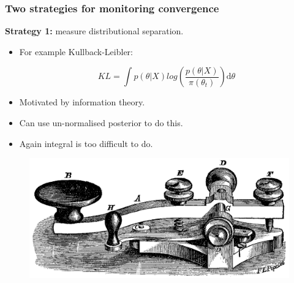 \documentclass[handout]{beamer}
\begin{document}
\begin{frame}
\frametitle{Two strategies for monitoring convergence}

\textbf{Strategy 1:} measure distributional separation.
\begin{itemize}
\item<3-> For example Kullback-Leibler:

\begin{equation}
KL=\int p(\theta|X) log\left(\frac{p(\theta|X)}{\pi(\theta_t)}\right) \mathrm{d}\theta
\end{equation}

\item<5-> Motivated by information theory.
\item<6-> Can use un-normalised posterior to do this.
\item<7-> Again integral is too difficult to do.
\end{itemize}

\begin{figure}[ht]
\centerline{\includegraphics[width=1\textwidth]{./Figures/morse.pdf}}
\end{figure}

\end{frame}
\end{document}

